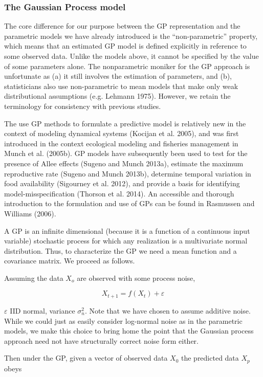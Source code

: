 \documentclass[]{components/elsarticle}
\begin{document}
\subsubsection{The Gaussian Process
model}\label{the-gaussian-process-model}

The core difference for our purpose between the GP representation and
the parametric models we have already introduced is the
``non-parametric'' property, which means that an estimated GP model is
defined explicitly in reference to some observed data. Unlike the models
above, it cannot be specified by the value of some parameters alone. The
nonparametric moniker for the GP approach is unfortunate as (a) it still
involves the estimation of parameters, and (b), statisticians also use
non-parametric to mean models that make only weak distributional
assumptions (e.g. Lehmann 1975). However, we retain the terminology for
consistency with previous studies.

The use GP methods to formulate a predictive model is relatively new in
the context of modeling dynamical systems (Kocijan et al. 2005), and was
first introduced in the context ecological modeling and fisheries
management in Munch et al. (2005b). GP models have subsequently been
used to test for the presence of Allee effects (Sugeno and Munch 2013a),
estimate the maximum reproductive rate (Sugeno and Munch 2013b),
determine temporal variation in food availability (Sigourney et al.
2012), and provide a basis for identifying model-misspecification
(Thorson et al. 2014). An accessible and thorough introduction to the
formulation and use of GPs can be found in Rasmussen and Williams
(2006).

A GP is an infinite dimensional (because it is a function of a
continuous input variable) stochastic process for which any realization
is a multivariate normal distribution. Thus, to characterize the GP we
need a mean function and a covariance matrix. We proceed as follows.

Assuming the data $X_o$ are observed with some process noise,

\[X_{t+1} = f(X_t) + \varepsilon\]

$\varepsilon$ IID normal, variance $\sigma_n^2$. Note that we have
chosen to assume additive noise. While we could just as easily consider
log-normal noise as in the parametric models, we make this choice to
bring home the point that the Gaussian process approach need not have
structurally correct noise form either.

Then under the GP, given a vector of observed data $X_0$ the predicted
data $X_p$ obeys
\end{document}
